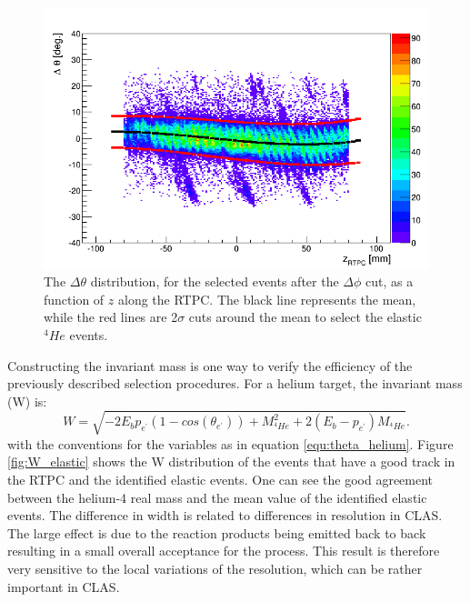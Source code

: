\begin{figure}[tbp]
\centering
\includegraphics[scale=0.370]{fig_rtpc/delta_theta_z.png}
\caption[]{The $\Delta \theta$ distribution, for the selected events after the $\Delta \phi$ cut, as a function of $z$ along the RTPC. The black line represents the mean, while the red lines are 2$\sigma$ cuts around the mean to select the elastic $^4He$ events. } 
\label{fig:delta_theta_elastic}
\end{figure} 


Constructing the invariant mass is one way to verify the efficiency of the previously described selection procedures. For a helium target, the invariant mass (W) is:
\begin{equation}
 W = \sqrt{-2E_{b}p_{e^{'}}(1-cos(\theta_{e^{'}})) + M_{^{4}He}^2 + 2(E_{b}-p_{e^{'}}) M_{^{4}He}}.
\end{equation}
with the conventions for the variables as in equation \ref{equ:theta_helium}.  
Figure \ref{fig:W_elastic} shows the W distribution of the events that have a 
good track in the RTPC and the identified elastic events. One can see the good 
agreement between the helium-4 real mass and the mean value of the identified 
elastic events. The difference in width is related to differences in 
resolution in CLAS.
The large effect is due to the reaction products being emitted back to 
back resulting in a small overall acceptance for the process. This result is
therefore very sensitive to the local 
variations of the resolution, which can be rather important in CLAS.

